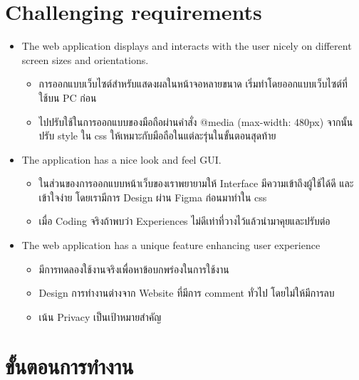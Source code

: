 \documentclass[17pt]{extarticle}
\begin{document}
\section{Challenging requirements}

\begin{itemize}
    \item The web application displays and interacts with the user nicely on different screen sizes and orientations.
          \begin{itemize}
              \item การออกแบบเว็บไซต์สำหรับแสดงผลในหน้าจอหลายขนาด เริ่มทำโดยออกแบบเว็บไซต์ที่ใช้บน PC ก่อน
              \item ไปปรับใช้ในการออกแบบของมือถือผ่านคำสั่ง @media (max-width: 480px) จากนั้นปรับ style ใน css ให้เหมาะกับมือถือในแต่ละรุ่นในขั้นตอนสุดท้าย
          \end{itemize}
    \item The application has a nice look and feel GUI.
          \begin{itemize}
              \item ในส่วนของการออกแบบหน้าเว็บของเราพยายามให้ Interface มีความเข้าถึงผู้ใช้ได้ดี และเข้าใจง่าย โดยเรามีการ Design ผ่าน Figma ก่อนมาทำใน css
              \item เมื่อ Coding จริงถ้าพบว่า Experiences ไม่ดีเท่าที่วางไว้แล้วนำมาคุยและปรับต่อ
          \end{itemize}
    \item The web application has a unique feature enhancing user experience
          \begin{itemize}
              \item มีการทดลองใช้งานจริงเพื่อหาข้อบกพร่องในการใช้งาน
              \item Design การทำงานต่างจาก Website ที่มีการ comment ทั่วไป โดยไม่ให้มีการลบ
              \item เน้น Privacy เป็นเป้าหมายสำคัญ
          \end{itemize}
\end{itemize}
\pagebreak
\section{ขั้นตอนการทำงาน}
\end{document}
